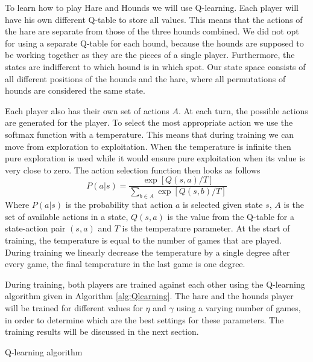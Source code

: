 To learn how to play Hare and Hounds we will use
Q-learning\cite{watkins1992q}.  Each player will have his own different
Q-table to store all values. This means that the actions of the hare are
separate from those of the three hounds combined. We did not opt for using
a separate Q-table for each hound, because the hounds are supposed to be
working together as they are the pieces of a single player. Furthermore,
the states are indifferent to which hound is in which spot. Our state space
consists of all different positions of the hounds and the hare, where all
permutations of hounds are considered the same state.

Each player also has their own set of actions $A$. At each turn, the
possible actions are generated for the player. To select the most
appropriate action we use the softmax function with a temperature. This
means that during training we can move from exploration to exploitation.
When the temperature is infinite then pure exploration is used while it
would ensure pure exploitation when its value is very close to zero. The
action selection function then looks as follows \[ P(a|s) =
    \frac{\exp[Q(s,a)/T]}{\sum_{b \in A} \exp[Q(s, b)/T]} \] Where $P(a|s)$
is the probability that action $a$ is selected given state $s$, $A$ is the
set of available actions in a state, $Q(s,a)$ is the value from the Q-table
for a state-action pair $(s,a)$ and $T$ is the temperature parameter. At
the start of training, the temperature is equal to the number of games that
are played. During training we linearly decrease the temperature by a
single degree after every game, the final temperature in the last game is
one degree.

During training, both players are trained against each other using the
Q-learning algorithm given in Algorithm \autoref{alg:Qlearning}. The hare
and the hounds player will be trained for different values for $\eta$ and
$\gamma$ using a varying number of games, in order to determine which are
the best settings for these parameters. The training results will be
discussed in the next section.

\begin{algorithm}
\caption{Q-learning algorithm \cite{alpaydin}}
\label{alg:Qlearning}
\begin{algorithmic}[1]
	\Repeat
\EndFor
\end{algorithmic}
\end{algorithm}

